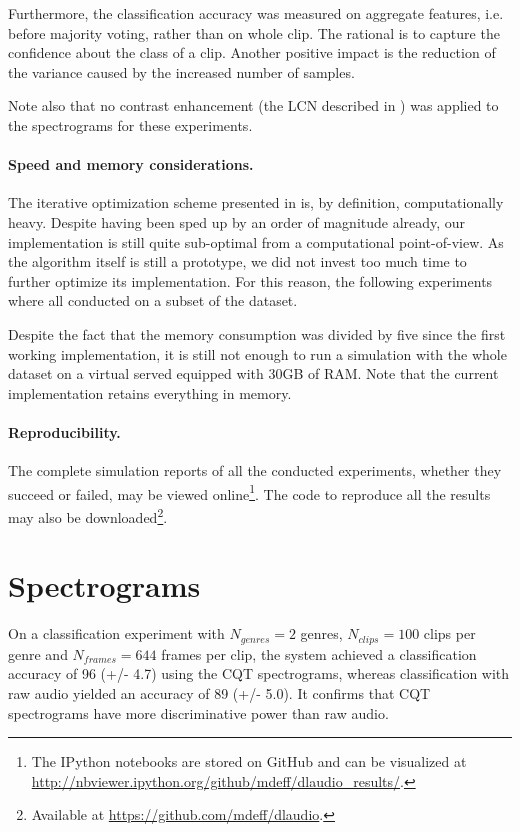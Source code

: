 Furthermore, the classification accuracy was measured on aggregate features, i.e. before majority voting, rather than on whole clip. The rational is to capture the confidence about the class of a clip. Another positive impact is the reduction of the variance caused by the increased number of samples.

Note also that no contrast enhancement (the \gls{LCN} described in ) was applied to the spectrograms for these experiments.

\paragraph{Speed and memory considerations.}
The iterative optimization scheme presented in  is, by definition, computationally heavy. Despite having been sped up by an order of magnitude already, our implementation is still quite sub-optimal from a computational point-of-view. As the algorithm itself is still a prototype, we did not invest too much time to further optimize its implementation. For this reason, the following experiments where all conducted on a subset of the dataset.

Despite the fact that the memory consumption was divided by five since the first working implementation, it is still not enough to run a simulation with the whole dataset on a virtual served equipped with 30GB of RAM. Note that the current implementation retains everything in memory.

\paragraph{Reproducibility.}
The complete simulation reports of all the conducted experiments, whether they succeed or failed, may be viewed online\footnote{The IPython notebooks are stored on GitHub and can be visualized at \url{http://nbviewer.ipython.org/github/mdeff/dlaudio_results/}.}.
The code to reproduce all the results may also be downloaded\footnote{Available at \url{https://github.com/mdeff/dlaudio}.}.

\section{Spectrograms} \label{sec:spectrograms}

On a classification experiment with $N_{genres} = 2$ genres, $N_{clips} = 100$ clips per genre and $N_{frames} = 644$ frames per clip, the system achieved a classification accuracy of 96 (+/- 4.7) using the \gls{CQT} spectrograms, whereas classification with raw audio yielded an accuracy of 89 (+/- 5.0). It confirms that \gls{CQT} spectrograms have more discriminative power than raw audio.


